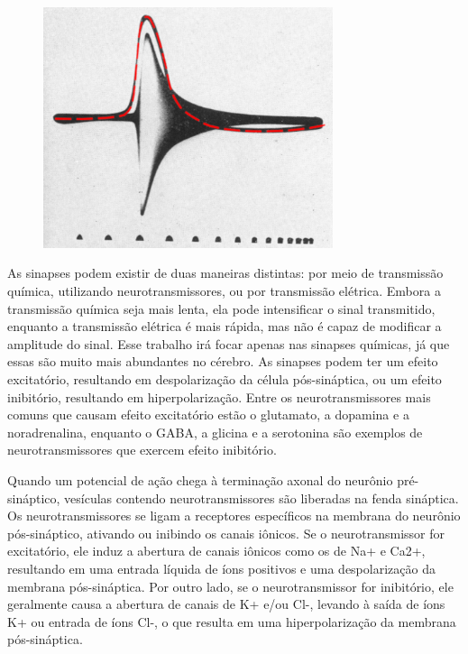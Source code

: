 \begin{figure}[!ht]
\centering
\includegraphics[width=8.5cm]{figuras/Action Potential.png}
\end{figure}

As sinapses podem existir de duas maneiras distintas: por meio de transmissão química, utilizando neurotransmissores, ou por
transmissão elétrica. Embora a transmissão química seja mais lenta, ela pode intensificar o sinal transmitido, enquanto a
transmissão elétrica é mais rápida, mas não é capaz de modificar a amplitude do sinal. Esse trabalho irá focar apenas nas sinapses químicas, 
já que essas são muito mais abundantes no cérebro. As sinapses podem ter um efeito
excitatório, resultando em despolarização da célula pós-sináptica, ou um efeito inibitório, resultando em hiperpolarização. Entre
os neurotransmissores mais comuns que causam efeito excitatório estão o glutamato, a dopamina e a noradrenalina, enquanto o GABA,
a glicina e a serotonina são exemplos de neurotransmissores que exercem efeito inibitório.

Quando um potencial de ação chega à terminação axonal do neurônio pré-sináptico, vesículas contendo neurotransmissores são
liberadas na fenda sináptica. Os neurotransmissores se ligam a receptores específicos na membrana do neurônio pós-sináptico,
ativando ou inibindo os canais iônicos. Se o neurotransmissor for excitatório, ele induz a abertura de canais iônicos como os de
Na+ e Ca2+, resultando em uma entrada líquida de íons positivos e uma despolarização da membrana pós-sináptica. Por outro lado, se
o neurotransmissor for inibitório, ele geralmente causa a abertura de canais de K+ e/ou Cl-, levando à saída de íons K+ ou entrada
de íons Cl-, o que resulta em uma hiperpolarização da membrana pós-sináptica.